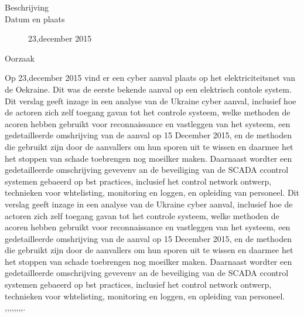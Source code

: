 \begin{description}
	\item[Beschrijving]
	\item[Datum en plaats] 23,december 2015
	\item[Oorzaak]
\end{description}

Op 23,december 2015  vind er een cyber aanval plaats op het elektriciteitsnet van de Oekraine. Dit was de eerste bekende aanval op een elektrisch contole  system.  Dit verslag geeft inzage in een analyse van de Ukraine cyber aanval,
inclusief hoe de actoren zich zelf toegang gavan tot het controle systeem, welke methoden de acoren hebben gebruikt voor reconnaissance en vastleggen van het systeem, een gedetailleerde omshrijving van de aanval op 15 December 2015, en de methoden die gebruikt zijn door de aanvallers om hun sporen uit te wissen en daarmee het het stoppen van schade toebrengen  nog moeilker maken. Daarnaast wordter  een gedetailleerde omschrijving gevevenv an de beveiliging van de SCADA ccontrol systemen gebaeerd op bst practices, inclusief het control network ontwerp, technieken voor whtelisting, monitoring en loggen, en  opleiding van personeel.
\cite{Whitehead2017ukrainepoweroutage}
\cite{noauthor_2022-nm}
\cite{zetter2016GridHack}
\cite{owens21032017ukrainemitigationstrategies}
\cite{cerulus2019FrontlineRussiaAttack}
\cite{grammatikis2019AttackIEC6087505104}
\cite{hidajat2016ScadaSimulator}
\cite{uscert20072021crashmalware}
\cite{zetter12062017malwareanalysis}
\cite{icsRussianHackingCyberWeapon}
\cite{usgovC2M2}
Dit verslag geeft inzage in een analyse van de Ukraine cyber aanval,
inclusief hoe de actoren zich zelf toegang gavan tot het controle systeem, welke methoden de acoren hebben gebruikt voor reconnaissance en vastleggen van het systeem, een gedetailleerde omshrijving van de aanval op 15 December 2015, en de methoden die gebruikt zijn door de aanvallers om hun sporen uit te wissen en daarmee het het stoppen van schade toebrengen  nog moeilker maken. Daarnaast wordter  een gedetailleerde omschrijving gevevenv an de beveiliging van de SCADA ccontrol systemen gebaeerd op bst practices, inclusief het control network ontwerp, technieken voor whtelisting, monitoring en loggen, en  opleiding van personeel.
\cite{Whitehead2017ukrainepoweroutage},\cite{zetter2016GridHack},\cite{boozallen2016lightwentout},\cite{finklejan2016UsBlamesRussianSandworm},\cite{desarnaud2017cyberattacks},\cite{caseli04112016intrusiondetectioncontrolsystem},\cite{rochascadatesting},\cite{hidajat2016ScadaSimulator},\cite{zetter2017moreDangerousMalware}.
